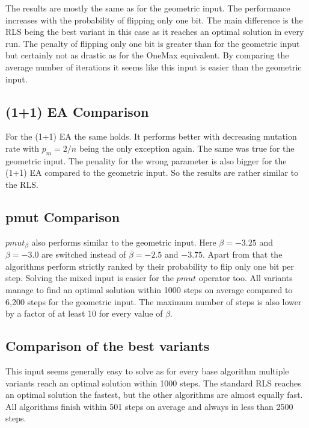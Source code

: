 

The results are mostly the same as for the geometric input.
The performance increases with the probability of flipping only one bit.
The main difference is the RLS being the best variant in this case as it reaches an optimal solution in every run.
The penalty of flipping only one bit is greater than for the geometric input but certainly not as drastic as for the OneMax equivalent.
By comparing the average number of iterations it seems like this input is easier than the geometric input.
\subsection{(1+1) EA Comparison}




For the (1+1) EA the same holds.
It performs better with decreasing mutation rate with $p_m=2/n$ being the only exception again.
The same was true for the geometric input.
The penality for the wrong parameter is also bigger for the (1+1) EA compared to the geometric input.
So the results are rather similar to the RLS.
\subsection{pmut Comparison}




$pmut_\beta$ also performs similar to the geometric input.
Here $\beta=-3.25$ and $\beta=-3.0$ are switched instead of $\beta = -2.5$ and $-3.75$.
Apart from that the algorithms perform strictly ranked by their probability to flip only one bit per step.
Solving the mixed input is easier for the $pmut$ operator too.
All variants manage to find an optimal solution within 1000 steps on average compared to 6,200 steps for the geometric input.
The maximum number of steps is also lower by a factor of at least 10 for every value of $\beta$.
\subsection{Comparison of the best variants}




This input seems generally easy to solve as for every base algorithm multiple variants reach an optimal solution within 1000 steps.
The standard RLS reaches an optimal solution the fastest, but the other algorithms are almost equally fast.
All algorithms finish within 501 steps on average and always in less than 2500 steps.

